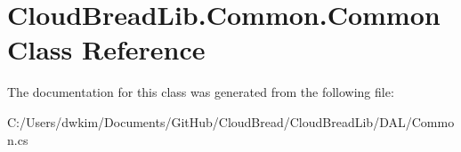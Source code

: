 \hypertarget{a00066}{}\section{Cloud\+Bread\+Lib.\+Common.\+Common Class Reference}
\label{a00066}


The documentation for this class was generated from the following file\+:\begin{DoxyCompactItemize}
\item 
C\+:/\+Users/dwkim/\+Documents/\+Git\+Hub/\+Cloud\+Bread/\+Cloud\+Bread\+Lib/\+D\+A\+L/Common.\+cs\end{DoxyCompactItemize}
